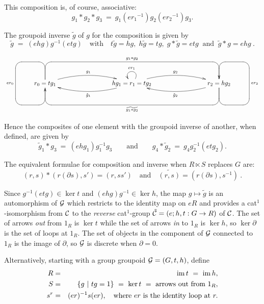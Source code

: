 \noindent
This composition is, of course, associative:
$$
g_1*g_2*g_3 ~=~ g_1({er_1}^{-1})g_2({er_2}^{-1})g_3.
$$

\noindent
The groupoid inverse  $\tilde{g}$  of  $g$  for the composition is given by
$$
\tilde{g} \; = \; (ehg)g^{-1}(etg)
\quad \mbox{with} \quad  
t \tilde{g} = hg, \; h \tilde{g} = tg, \; g * \tilde{g} = etg  
\;\; \mbox{and} \;\;
\tilde{g} * g = ehg~.
$$  

$$
\xy
\xymatrix{
  &&&&&&&& \\
  &  r_0=tg_1 \ar `u[-1,-1] `[1,-1] `[1,0]_{er_0} `[0,0] [0,0]
            \ar@/^3ex/[rrr]^{g_1}
            \ar `u[-1,1] `[0,6]^{g_1 * g_2} [0,6]
  &&& hg_1=r_1=tg_2 \ar@/^3ex/[rrr]^{g_2}
                    \ar@/^3ex/[lll]^{\tilde{g}_1}
                    \ar@(ur,ul)_{er_1}
     &&& r_2=hg_2 \ar `d[1,1] `[-1,1] `[-1,0]_{er_2} `[0,0] [0,0]
                  \ar@/^3ex/[lll]^{\tilde{g}_2}
                  \ar `d[1,-1] `[0,-6]^{\widetilde{g_1 * g_2}} [0,-6] 
         & \\
  &&&&&&&& \\
}
\endxy
$$

\noindent
Hence the composites of one element with the groupoid inverse of another, 
when defined, are given by 
\begin{equation} \label{eq:inv-comps}
\tilde{g}_1 * g_3 ~=~ (ehg_1)g_1^{-1}g_3
\qquad\mbox{and}\qquad
g_4 * \tilde{g}_2 ~=~ g_4g_2^{-1}(etg_2).
\end{equation}

\medskip\noindent
The equivalent formulae for composition and inverse 
when  $R \ltimes S$  replaces $G$ are:
$$
(r, s) * (r (\partial s), s') = (r, ss')
\quad \mbox{and} \quad  
\widetilde{(r,s)} = (r(\partial s), s^{-1})~.
$$

Since  $g^{-1}(etg) \in \ker t$  and  $(ehg)g^{-1} \in \ker h$,
the map  $g \mapsto \tilde{g}$  is an automorphism of  $\mathcal{G}$
which restricts to the identity map on  $eR$  and
provides a cat$^1$-isomorphism from  $\mathcal{C}$  to the \emph{reverse}
cat$^1$-group $\tilde{\mathcal{C}} = (e;h,t : G \to R)$ of $\mathcal{C}$.
The set of arrows \emph{out} from  $1_R$  is  $\ker t$
while the set of arrows \emph{in} to  $1_R$  is  $\ker h$,
so  $\ker \partial$  is the set of loops at  $1_R$.
The set of objects in the component of  $\mathcal{G}$
connected to  $1_R$  is the image of  $\partial$,
so  $\mathcal{G}$  is discrete when  $\partial = 0$.

Alternatively, starting with a group groupoid $\mathcal{G} = (G,t,h)$, define
\begin{eqnarray*}
  R & = & \mathrm{im}\, t ~=~ \mathrm{im}\, h, \\
  S & = & \{g ~|~ tg = 1\} ~=~ \ker t ~=~ \mbox{arrows out from}~ 1_R, \\
s^r & = & (er)^{-1}s(er), 
\quad\text{where}~ er ~\text{is the identity loop at}~ r.
\end{eqnarray*}

